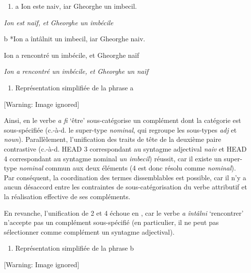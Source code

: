 \begin{enumerate}
\item \label{bkm:Ref299913361}a  Ion este naiv, iar Gheorghe un imbecil.


\end{enumerate}
    \textit{Ion est naïf, et Gheorghe un imbécile } 

  b  *Ion a întâlnit un imbecil, iar Gheorghe naiv.

Ion a rencontré un imbécile, et Gheorghe naïf 

{\itshape
Ion a rencontré un imbécile, et Gheorghe un naïf} 


\begin{enumerate}
\item \label{bkm:Ref299913495}Représentation simplifiée de la phrase a 


\end{enumerate}
{   [Warning: Image ignored] %
} 

Ainsi, en  le verbe \textit{a fi} `être' sous-catégorise un complément dont la catégorie est sous-spécifiée (c.-à-d. le super-type \textit{nominal}, qui regroupe les sous-types \textit{adj} et \textit{noun}). Parallèlement, l'unification des traits de tête de la deuxième paire contrastive (c.-à-d. HEAD 3 correspondant au syntagme adjectival \textit{naiv} et HEAD 4 correspondant au syntagme nominal \textit{un imbecil}) réussit, car il existe un super-type \textit{nominal} commun aux deux éléments (4 est donc résolu comme \textit{nominal}). Par conséquent, la coordination des termes dissemblables est possible, car il n'y a aucun désaccord entre les contraintes de sous-catégorisation du verbe attributif et la réalisation effective de ses compléments.

En revanche, l'unification de 2 et 4 échoue en , car le verbe \textit{a întâlni} `rencontrer' n'accepte pas un complément sous-spécifié (en particulier, il ne peut pas sélectionner comme complément un syntagme adjectival).


\begin{enumerate}
\item \label{bkm:Ref299913497}Représentation simplifiée de la phrase b 


\end{enumerate}
{   [Warning: Image ignored] %
} 

